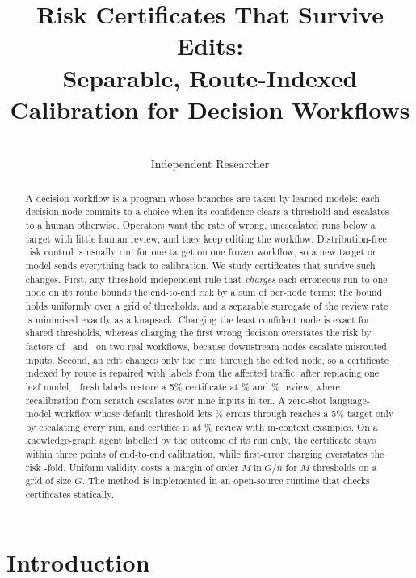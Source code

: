 \documentclass[11pt]{article}
\title{Risk Certificates That Survive Edits:\\
Separable, Route-Indexed Calibration for Decision Workflows}
\author{\authorname\\ Independent Researcher}
\date{}
\theoremstyle{definition}
\theoremstyle{remark}
\begin{document}
\maketitle

\begin{abstract}
A decision workflow is a program whose branches are taken by learned models: each decision
node commits to a choice when its confidence clears a threshold and escalates to a human
otherwise. Operators want the rate of wrong, unescalated runs below a target with little
human review, and they keep editing the workflow. Distribution-free risk control is usually
run for one target on one frozen workflow, so a new target or model sends everything back
to calibration. We study certificates that survive such changes. First, any
threshold-independent rule that \emph{charges} each erroneous run to one node on its route
bounds the end-to-end risk by a sum of per-node terms; the bound holds uniformly over a grid
of thresholds, and a separable surrogate of the review rate is minimised exactly as a
knapsack. Charging the least confident node is exact for shared thresholds, whereas charging
the first wrong decision overstates the risk by factors of \FdOverstateMax\ and
\FdOverstateMin\ on two real workflows, because downstream nodes escalate misrouted inputs.
Second, an edit changes only the runs through the edited node, so a certificate indexed by
route is repaired with labels from the affected traffic: after replacing one leaf model,
\EditM\ fresh labels restore a 5\% certificate at \EditLocalClinc\% and \EditLocalMassive\%
review, where recalibration from scratch escalates over nine inputs in ten. A zero-shot
language-model workflow whose default threshold lets \LlmDefaultRiskT\% errors through
reaches a 5\% target only by escalating every run, and certifies it at \RevGLClevelFive\%
review with in-context examples. On a knowledge-graph agent labelled by the outcome of
its run only, the certificate stays within three points of end-to-end calibration, while
first-error charging overstates the risk \FdRatioWTen-fold. Uniform validity costs a margin
of order $M\ln G/n$ for $M$ thresholds on a grid of size $G$. The method is implemented in an
open-source runtime that checks certificates statically.
\end{abstract}

\section{Introduction}
\end{document}
